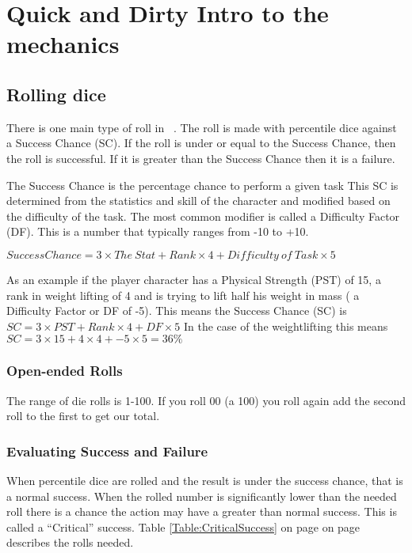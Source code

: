 \chapter{Quick and Dirty Intro to the mechanics}

\section{Rolling dice}

There is one main type of roll in \SH\ . The roll is 
made with percentile dice against a Success Chance (SC). If the roll 
is under or equal to the Success Chance, then the roll is successful.
If it is greater than the Success Chance then it is a failure.

The Success Chance is the percentage chance to perform a given task This SC is
determined from the statistics and skill of the character 
and modified based on the difficulty of the task. The most common 
modifier is called a Difficulty Factor (DF). This is a number that typically 
ranges from -10 to +10.

$ {Success Chance} = 3 \times {The\ Stat} + Rank \times 4 + {Difficulty\ of\ Task} \times 5 $

As an example if the player character has a Physical Strength (PST) of 15, a rank in 
weight lifting of 4 and is trying to lift half his weight in mass ( a Difficulty Factor or DF of -5). 
This means the Success Chance (SC) is $ SC = 3 \times PST + Rank \times 4 + DF \times 5 $
In the case of the weightlifting this means $ SC = 3 \times 15 + 4 \times 4 + -5 \times 5  = 36\% $

\subsection{Open-ended Rolls}

The range of die rolls is 1-100. If you roll 00 (a 100) you roll again add
the second roll to the first to get our total.

\subsection{Evaluating Success and Failure}

When percentile dice are rolled and the result is under the success chance, that
is a normal success. When the rolled number is significantly lower than the needed 
roll there is a chance the action may have a greater than normal success. This is 
called a ``Critical'' success. Table \ref{Table:CriticalSuccess} on page on
page~\pageref{Table:CriticalSuccess} describes the rolls needed.

